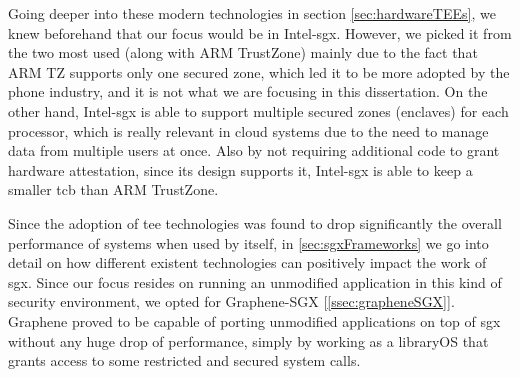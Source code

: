 Going deeper into these modern technologies in section \ref{sec:hardwareTEEs}, we knew beforehand that our focus would be in Intel-\gls{sgx}. However, we picked it from the two most used (along with ARM TrustZone) mainly due to the fact that ARM TZ supports only one secured zone, which led it to be more adopted by the phone industry, and it is not what we are focusing in this dissertation. On the other hand, Intel-\gls{sgx} is able to support multiple secured zones (enclaves) for each processor, which is really relevant in cloud systems due to the need to manage data from multiple users at once.
Also by not requiring additional code to grant hardware attestation, since its design supports it, Intel-\gls{sgx} is able to keep a smaller \gls{tcb} than ARM TrustZone.

Since the adoption of \gls{tee} technologies was found to drop significantly the overall performance of systems when used by itself, in \ref{sec:sgxFrameworks} we go into detail on how different existent technologies can positively impact the work of \gls{sgx}. Since our focus resides on running an unmodified application in this kind of security environment, we opted for Graphene-SGX [\ref{ssec:grapheneSGX}]. Graphene proved to be capable of porting unmodified applications on top of \gls{sgx} without any huge drop of performance, simply by working as a libraryOS that grants access to some restricted and secured system calls.








